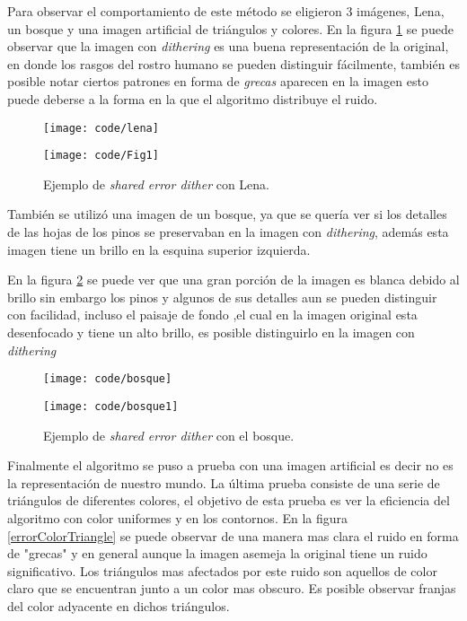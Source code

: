 \documentclass[conference]{IEEEtran}
\begin{document}
Para observar el comportamiento de este método se eligieron 3 imágenes, Lena, un bosque y
una imagen artificial de triángulos y colores. En la figura \ref{errorColorLena}
se puede observar que la imagen con \textit{dithering} es una buena representación de la original, en donde  los rasgos del rostro humano se pueden distinguir fácilmente, también es posible notar ciertos patrones en forma de \textit{grecas} aparecen en la imagen esto puede deberse a la forma en la que el algoritmo distribuye el ruido.



\begin{figure}[htbp]
\centerline{\texttt{[image: code/lena]}}
\centerline{\texttt{[image: code/Fig1]}}
\caption{Ejemplo de \textit{shared error dither} con Lena.}
\label{errorColorLena}
\end{figure}

También se utilizó una imagen de un bosque, ya que se quería ver si los detalles de las hojas de los pinos se preservaban en la imagen con \textit{dithering}, además esta imagen tiene un brillo en la esquina superior izquierda.

En la figura \ref{errorColorTree} se puede ver que una gran porción de la imagen es blanca debido al brillo sin embargo los pinos y algunos de sus detalles aun se pueden distinguir con facilidad, incluso el paisaje de fondo ,el cual en la imagen original  esta desenfocado y tiene un alto brillo, es posible distinguirlo en la imagen con \textit{dithering}


\begin{figure}[htbp]
\centerline{\texttt{[image: code/bosque]}}
\centerline{\texttt{[image: code/bosque1]}}
\caption{Ejemplo de \textit{shared error dither} con el bosque.}
\label{errorColorTree}
\end{figure}


Finalmente el algoritmo se puso a prueba con una imagen artificial es decir no es la representación
de nuestro mundo. La última prueba consiste de una serie de triángulos de diferentes colores, el objetivo de  esta prueba es ver la eficiencia del algoritmo con color uniformes y en los contornos. En la figura \ref{errorColorTriangle} se puede observar de una manera mas clara el ruido en forma de "grecas" y en general aunque la imagen asemeja la original tiene un ruido significativo. Los triángulos mas afectados por este ruido son aquellos de color claro que se encuentran junto a un color mas obscuro. Es posible observar  franjas del color adyacente en dichos triángulos.
\end{document}
